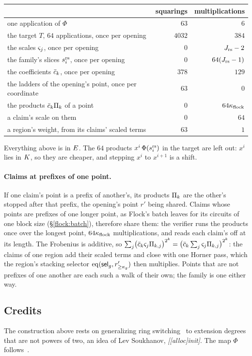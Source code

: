 \begin{center}
\begin{tabular}{lrr}
& squarings & multiplications\\[2pt]
\hline
one application of $\Phi$ & $63$ & $6$\\
the target $T$, $64$ applications, once per opening & $4032$ & $384$\\
the scales $\varsigma_j$, once per opening & $0$ & $J_{\mathrm{rs}}-2$\\
the family's slices $s^{\mathrm{rs}}_{i}$, once per opening & $0$ & $64(J_{\mathrm{rs}}-1)$\\
the coefficients $\bar c_k$, once per opening & $378$ & $129$\\
the ladders of the opening's point, once per coordinate & $63$ & $0$\\
the products $\bar c_k\Pi_k$ of a point & $0$ & $64\kappa_{\mathrm{flock}}$\\
a claim's scale on them & $0$ & $64$\\
a region's weight, from its claims' scaled terms & $63$ & $1$\\
\end{tabular}
\end{center}

Everything above is in $E$. The $64$ products $x^i\,\Phi(s^{\mathrm{rs}}_{i})$ in the target are left out: $x^i$ lies in $K$, so they are cheaper, and stepping $x^i$ to $x^{i+1}$ is a shift.

\paragraph{Claims at prefixes of one point.} If one claim's point is a prefix of another's, its products $\Pi_k$ are the other's stopped after that prefix, the opening's point $r'$ being shared. Claims whose points are prefixes of one longer point, as Flock's batch leaves for its circuits of one block size (\S\ref{flock:batch}), therefore share them: the verifier runs the products once over the longest point, $64\kappa_{\mathrm{flock}}$ multiplications, and reads each claim's off at its length. The Frobenius is additive, so $\sum_j\bigl(\bar c_k\varsigma_j\Pi_{k,j}\bigr)^{2^k}=\bigl(\bar c_k\sum_j\varsigma_j\Pi_{k,j}\bigr)^{2^k}$: the claims of one region add their scaled terms and close with one Horner pass, which the region's stacking selector $\operatorname{eq}(\mathsf{sel}_g,r'_{\ge\kappa_g})$ then multiplies. Points that are not prefixes of one another are each such a walk of their own; the family is one either way.

\subsection{Credits}\label{rs:credits}

The construction above rests on generalizing ring switching~\cite{DP24} to extension degrees that are not powers of two, an idea of Lev Soukhanov, \textit{[[alloc]init]}. The map $\Phi$ follows~\cite{Flock26}.
